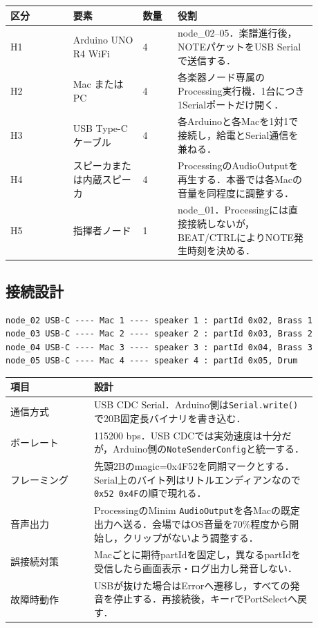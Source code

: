 \documentclass[a4paper,11pt]{jsarticle}
\begin{document}
\begin{longtable}{p{0.18\linewidth}p{0.20\linewidth}p{0.10\linewidth}p{0.40\linewidth}}
\toprule
区分 & 要素 & 数量 & 役割 \\
\midrule
\endhead
H1 & Arduino UNO R4 WiFi & 4 & node\_02--05．楽譜進行後，NOTEパケットをUSB Serialで送信する． \\
H2 & Mac またはPC & 4 & 各楽器ノード専属のProcessing実行機．1台につき1Serialポートだけ開く． \\
H3 & USB Type-Cケーブル & 4 & 各Arduinoと各Macを1対1で接続し，給電とSerial通信を兼ねる． \\
H4 & スピーカまたは内蔵スピーカ & 4 & ProcessingのAudioOutputを再生する．本番では各Macの音量を同程度に調整する． \\
H5 & 指揮者ノード & 1 & node\_01．Processingには直接接続しないが，BEAT/CTRLによりNOTE発生時刻を決める． \\
\bottomrule
\end{longtable}

\subsection{接続設計}

\begin{lstlisting}[style=textdiagram, caption={Mac 4台構成の接続図}]
node_02 USB-C ---- Mac 1 ---- speaker 1 : partId 0x02, Brass 1
node_03 USB-C ---- Mac 2 ---- speaker 2 : partId 0x03, Brass 2
node_04 USB-C ---- Mac 3 ---- speaker 3 : partId 0x04, Brass 3
node_05 USB-C ---- Mac 4 ---- speaker 4 : partId 0x05, Drum
\end{lstlisting}

\begin{longtable}{p{0.24\linewidth}p{0.64\linewidth}}
\toprule
項目 & 設計 \\
\midrule
\endhead
通信方式 & USB CDC Serial．Arduino側は\texttt{Serial.write()}で20B固定長バイナリを書き込む． \\
ボーレート & 115200 bps．USB CDCでは実効速度は十分だが，Arduino側の\texttt{NoteSenderConfig}と統一する． \\
フレーミング & 先頭2Bのmagic=0x4F52を同期マークとする．Serial上のバイト列はリトルエンディアンなので\texttt{0x52 0x4F}の順で現れる． \\
音声出力 & ProcessingのMinim \texttt{AudioOutput}を各Macの既定出力へ送る．会場ではOS音量を70\%程度から開始し，クリップがないよう調整する． \\
誤接続対策 & Macごとに期待partIdを固定し，異なるpartIdを受信したら画面表示・ログ出力し発音しない． \\
故障時動作 & USBが抜けた場合はErrorへ遷移し，すべての発音を停止する．再接続後，キー\texttt{r}でPortSelectへ戻す． \\
\bottomrule
\end{longtable}
\end{document}
